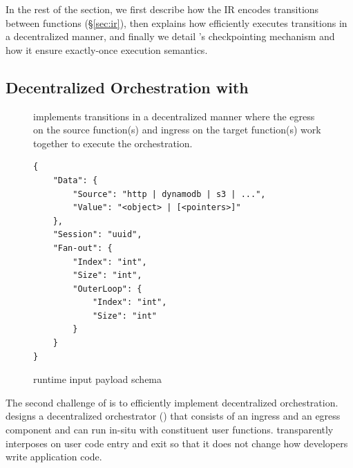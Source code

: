 In the rest of the section, we first describe how the \name{} IR encodes
transitions between functions (\S\ref{sec:ir}), then explains how \deorc{}
efficiently executes transitions in a decentralized manner, and finally we
detail \name{}'s checkpointing mechanism and how it ensure exactly-once
execution semantics. 






\subsection{Decentralized Orchestration with \deorc{}}\label{sec:runtime}

\begin{figure}[t!]
	\centering
	\caption{\deorc{} implements transitions in a decentralized manner where
the egress on the source function(s) and ingress on the target function(s)
work together to execute the orchestration. }
	\label{fig:transition}
\end{figure}

\begin{figure}[]
    \begin{verbatim}
{
    "Data": {
        "Source": "http | dynamodb | s3 | ...",
        "Value": "<object> | [<pointers>]"
    },
    "Session": "uuid",
    "Fan-out": {
        "Index": "int",
        "Size": "int",
        "OuterLoop": {
            "Index": "int",
            "Size": "int"
        }
    }
}
    \end{verbatim}
    \caption{\name{} runtime input payload schema}
    \label{fig:input-format}
\end{figure}

The second challenge of \name{} is to efficiently implement decentralized
orchestration. \name{} designs a decentralized orchestrator (\deorc) that
consists of an ingress and an egress component and can run in-situ with
constituent user functions. \deorc{} transparently interposes on user code
entry and exit so that it does not change how developers write application
code.


